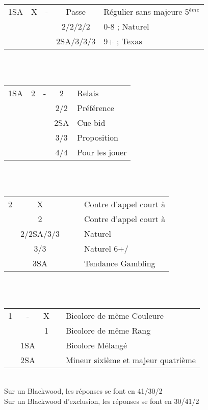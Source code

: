 \documentclass[a4paper, oneside, 11pt]{report}
\begin{document}
	\begin{tabular}{cccc|l}
	1SA & X & - & Passe & Régulier sans majeure 5$^{ème}$\\
	&&& 2\trefle/2\carreau/2\coeur/2\pique & 0-8 ; Naturel\\
	&&& 2SA/3\trefle/3\carreau/3\coeur & 9+ ; Texas\\
	\end{tabular}\\\\

	\begin{tabular}{cccc|l}
	1SA & 2\trefle & - & 2\carreau & Relais\\
	&&& 2\coeur/2\pique & Préférence\\
	&&& 2SA & Cue-bid\\
	&&& 3\coeur/3\pique & Proposition\\
	&&& 4\coeur/4\pique & Pour les jouer\\
	\end{tabular}\\\\

	\begin{tabular}{cccc|l}
	2\carreau & X &&& Contre d'appel court à \pique\\
	& 2\coeur &&& Contre d'appel court à \coeur\\
	& 2\pique/2SA/3\trefle/3\carreau &&& Naturel\\
	& 3\coeur/3\pique &&& Naturel 6+\coeur/\pique\\
	& 3SA &&& Tendance Gambling\\
	\end{tabular}\\\\
	
	\begin{tabular}{cccc|l}
	1\trefle & -  & X && Bicolore de même Couleure\\
	&& 1\carreau && Bicolore de même Rang\\
	& 1SA &&& Bicolore Mélangé\\
	& 2SA &&& Mineur sixième et majeur quatrième\\
	\end{tabular}\\
		
	Sur un Blackwood, les réponses se font en 41/30/2\\
	Sur un Blackwood d'exclusion, les réponses se font en 30/41/2\\
\end{document}

